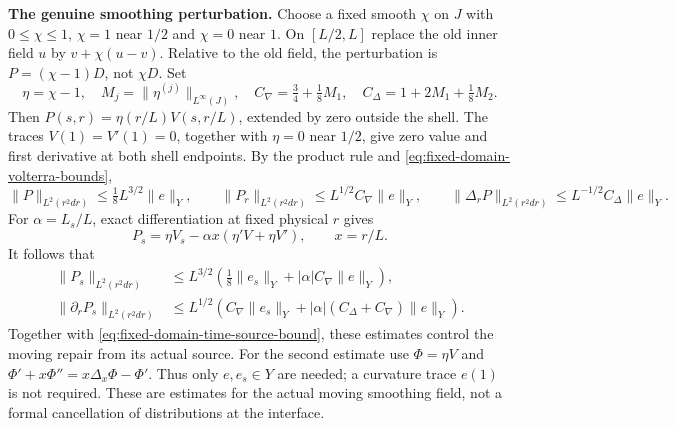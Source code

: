 \medskip
\noindent\textbf{The genuine smoothing perturbation.}
Choose a fixed smooth $\chi$ on $J$ with $0\le\chi\le1$,
$\chi=1$ near $1/2$ and $\chi=0$ near $1$.  On $[L/2,L]$ replace
the old inner field $u$ by $v+\chi(u-v)$.  Relative to the old field,
the perturbation is $P=(\chi-1)D$, not $\chi D$.  Set
\[
 \eta=\chi-1,\quad M_j=\|\eta^{(j)}\|_{L^\infty(J)},\quad
 C_\nabla=\tfrac34+\tfrac18M_1,\quad
 C_\Delta=1+2M_1+\tfrac18M_2.
\]
Then $P(s,r)=\eta(r/L)V(s,r/L)$, extended by zero outside the shell.
The traces $V(1)=V'(1)=0$, together with $\eta=0$ near $1/2$, give
zero value and first derivative at both shell endpoints.  By the
product rule and \eqref{eq:fixed-domain-volterra-bounds},
\[
 \|P\|_{L^2(r^2dr)}\le\tfrac18L^{3/2}\|e\|_Y,\qquad
 \|P_r\|_{L^2(r^2dr)}\le L^{1/2}C_\nabla\|e\|_Y,
 \qquad
 \|\Delta_rP\|_{L^2(r^2dr)}\le L^{-1/2}C_\Delta\|e\|_Y.
\]
For $\alpha=L_s/L$, exact differentiation at fixed physical $r$ gives
\[
 P_s=\eta V_s-\alpha x(\eta'V+\eta V'),\qquad x=r/L.
\]
It follows that
\begin{align*}
 \|P_s\|_{L^2(r^2dr)}
 &\le L^{3/2}\left(\tfrac18\|e_s\|_Y+
        |\alpha|C_\nabla\|e\|_Y\right),\\
 \|\partial_rP_s\|_{L^2(r^2dr)}
 &\le L^{1/2}\left(C_\nabla\|e_s\|_Y+
        |\alpha|(C_\Delta+C_\nabla)\|e\|_Y\right).
\end{align*}
Together with \eqref{eq:fixed-domain-time-source-bound}, these estimates
control the moving repair from its actual source. For the second estimate use
$\Phi=\eta V$ and
$\Phi'+x\Phi''=x\Delta_x\Phi-\Phi'$.
Thus only $e,e_s\in Y$ are needed; a curvature trace $e(1)$ is not
required.  These are estimates for the actual moving smoothing field,
not a formal cancellation of distributions at the interface.

